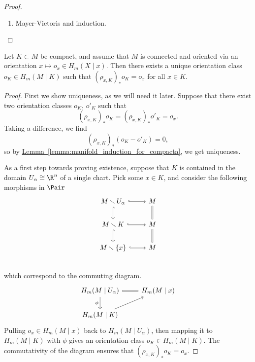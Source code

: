\documentclass[main.tex]{subfiles}
\begin{document}
\begin{proof}
\begin{enumerate}
    \item Mayer-Vietoris and induction.
  \end{enumerate}
\end{proof}

\begin{proposition}
  \label{prop:orientation_class_for_compacta}
  Let \(K \subset M\) be compact, and assume that \(M\) is connected and oriented via an orientation \(x \mapsto o_{x} \in H_{m}(X \mid x)\). Then there exists a unique orientation class \(o_{K} \in H_{m}(M \mid K)\) such that \((\rho_{x, K})_{*}o_{K} = o_{x}\) for all \(x \in K\).
\end{proposition}
\begin{proof}
  First we show uniqueness, as we will need it later. Suppose that there exist two orientation classes \(o_{K}\), \(o'_{K}\) such that
  \begin{equation*}
    (\rho_{x, K})_{*}o_{K} = (\rho_{x, K})_{*}o'_{K} = o_{x}.
  \end{equation*}
  Taking a difference, we find
  \begin{equation*}
    (\rho_{x, K})_{*}(o_{K} - o'_{K}) = 0,
  \end{equation*}
  so by \hyperref[lemma:manifold_induction_for_compacta]{Lemma~\ref*{lemma:manifold_induction_for_compacta}}, we get uniqueness.

  As a first step towards proving existence, suppose that \(K\) is contained in the domain \(U_{\alpha} \cong \R^{n}\) of a single chart. Pick some \(x \in K\), and consider the following morphisms in \(\Pair\)
  \begin{equation*}
    \begin{tikzcd}
      M \smallsetminus U_{\alpha}
      \arrow[r, hook]
      \arrow[d, hook]
      & M
      \arrow[d, equals]
      \\
      M \smallsetminus K
      \arrow[r, hook]
      \arrow[d, hook]
      & M
      \arrow[d, equals]
      \\
      M \smallsetminus \{x\}
      \arrow[r, hook]
      & M
      \\
    \end{tikzcd}
  \end{equation*}
  which correspond to the commuting diagram.
  \begin{equation*}
    \begin{tikzcd}
      H_{m}(M \mid U_{\alpha})
      \arrow[r, equals]
      \arrow[d, swap, "\phi"]
      & H_{m}(M \mid x)
      \\
      H_{m}(M \mid K)
      \arrow[ur]
    \end{tikzcd}
  \end{equation*}
  Pulling \(o_{x} \in H_{m}(M \mid x)\) back to \(H_{m}(M \mid U_{\alpha})\), then mapping it to \(H_{m}(M \mid K)\) with \(\phi\) gives an orientation class \(o_{K} \in H_{m}(M \mid K)\). The commutativity of the diagram ensures that \((\rho_{x, K})_{*}o_{K} = o_{x}\).


\end{proof}
\end{document}
